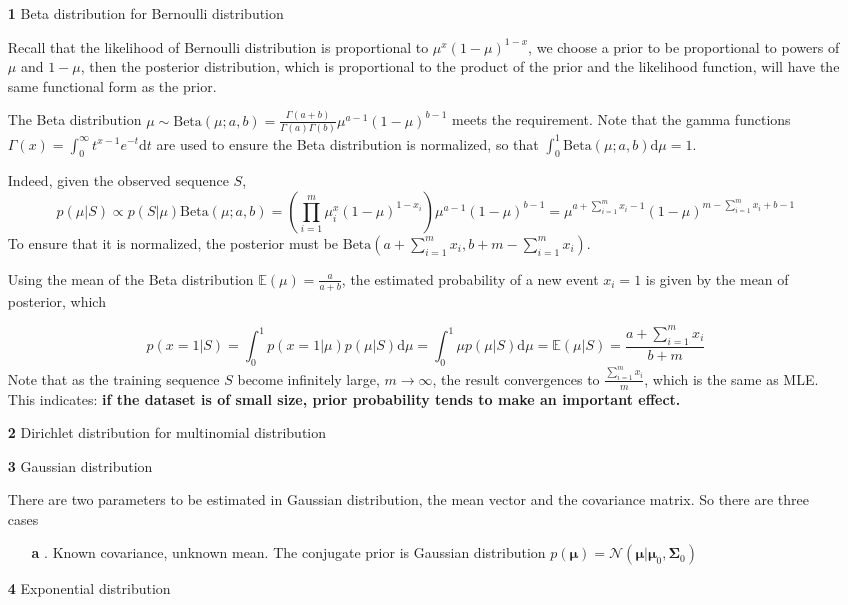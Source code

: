 \documentclass{article}
\begin{document}
	\begin{itemize}
	\item [\textbf{1}] Beta distribution for Bernoulli distribution
	
	Recall that the likelihood of Bernoulli distribution is proportional to $\mu^x (1-\mu)^{1-x}$,	we choose a prior to be proportional to powers of $\mu$ and $1-\mu$, then the posterior distribution, which is proportional to the product of the prior and the likelihood function, will have the same functional form as the prior.
	
	The Beta distribution $\mu\sim \mathrm{Beta}(\mu;a,b)=\frac{\Gamma(a+b)}{\Gamma(a)\Gamma(b)}\mu^{a-1}(1-\mu)^{b-1}$ meets the requirement. Note that the gamma functions $\Gamma(x)=\int^\infty_0 t^{x-1} e^{-t} \mathrm{d} t$ are used to ensure the Beta distribution is normalized, so that $\int_0^1 \mathrm{Beta}(\mu;a,b)\mathrm{d}\mu = 1$.
	
	Indeed, given the observed sequence $S$, 
	\begin{equation*}
	p(\mu|S) \propto p(S|\mu) \mathrm{Beta}(\mu;a,b) = \left( \prod_{i=1}^m \mu^x_i (1-\mu)^{1-x_i} \right) \mu^{a-1}(1-\mu)^{b-1} = \mu^{a+\sum_{i=1}^m x_i-1}(1-\mu)^{m-\sum_{i=1}^m x_i + b-1}
	\end{equation*}
To ensure that it is normalized, the posterior must be $\mathrm{Beta}(a+\sum_{i=1}^m x_i, b+m-\sum_{i=1}^m x_i)$.

	Using the mean of the Beta distribution $\mathbb{E}(\mu)=\frac{a}{a+b}$, the estimated probability of a new event $x_i=1$ is given by the mean of posterior, which
	
	\begin{equation*}
	p(x=1|S)=\int^1_0 p(x=1|\mu)p(\mu|S) \mathrm{d}\mu = \int^1_0 \mu p(\mu|S) \mathrm{d}\mu = \mathbb{E}(\mu|S) = \frac{a+\sum_{i=1}^m x_i}{b+m}
	\end{equation*}
Note that as the training sequence $S$ become infinitely large, $m\rightarrow\infty$, the result convergences to $\frac{\sum_{i=1}^m x_i}{m}$, which is the same as MLE. This indicates: \textbf{if the dataset is of small size, prior probability tends to make an important effect.}
	
	\item [\textbf{2}] Dirichlet distribution for multinomial distribution

		
	
	\item [\textbf{3}] Gaussian distribution

	There are two parameters to be estimated in Gaussian distribution, the mean vector and the covariance matrix. So there are three cases
	
	\begin{itemize}
	\item [\textbf{a}]. Known covariance, unknown mean.
	The conjugate prior is Gaussian distribution $p(\bm{\mu})=\mathcal{N}(\bm{\mu}|\bm{\mu}_0, \bm{\Sigma}_0)$
	\end{itemize}		
	
	\item [\textbf{4}] Exponential distribution
	\end{itemize}
	
\end{document}
